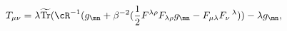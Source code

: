 \begin{equation}
    T_{\mu\nu} =\lambda  \widetilde{\mathrm{Tr}} (\cR^{-1}(g_\mn+\beta^{-2}(\frac 12 F^{\lambda\rho}F_{\lambda\rho} g_\mn
    -F_{\mu\lambda}F_{\nu}\,{}^{\lambda}))- \lambda g_\mn,
\end{equation}

